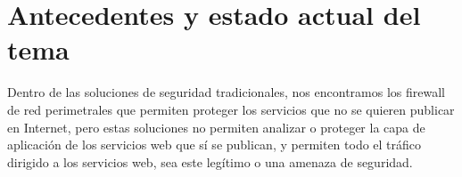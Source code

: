 \section{Antecedentes y estado actual del tema}

\par Dentro de las soluciones de seguridad tradicionales, nos encontramos los firewall de red pe\-ri\-me\-tra\-les que
permiten proteger los servicios que no se quieren publicar en Internet, pero estas soluciones no permiten analizar o
proteger la capa de aplicación de los servicios web que sí se publican, y permiten todo el tráfico dirigido a los
servicios web, sea este legítimo o una amenaza de seguridad.

